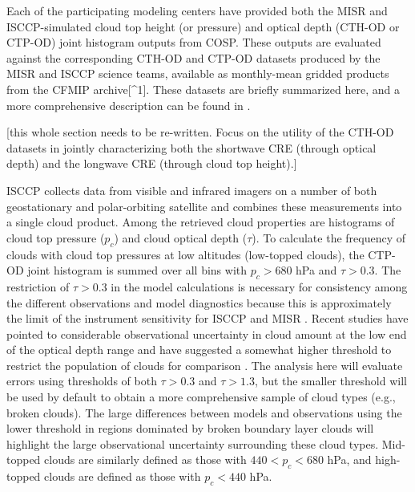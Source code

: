 Each of the participating modeling centers have provided both the MISR
and ISCCP-simulated cloud top height (or pressure) and optical depth
(CTH-OD or CTP-OD) joint histogram outputs from COSP. These outputs are
evaluated against the corresponding CTH-OD and CTP-OD datasets produced
by the MISR and ISCCP science teams, available as monthly-mean gridded
products from the CFMIP archive{[}\^{}1{]}. These datasets are briefly
summarized here, and a more comprehensive description can be found in
\citet{marchand_et_al_2010}.

{[}this whole section needs to be re-written. Focus on the utility of
the CTH-OD datasets in jointly characterizing both the shortwave CRE
(through optical depth) and the longwave CRE (through cloud top
height).{]}

ISCCP collects data from visible and infrared imagers on a number of
both geostationary and polar-orbiting satellite and combines these
measurements into a single cloud product. Among the retrieved cloud
properties are histograms of cloud top pressure (\(p_c\)) and cloud
optical depth (\(\tau\)). To calculate the frequency of clouds with
cloud top pressures at low altitudes (low-topped clouds), the CTP-OD
joint histogram is summed over all bins with \(p_c > 680\) hPa and
\(\tau > 0.3\). The restriction of \(\tau > 0.3\) in the model
calculations is necessary for consistency among the different
observations and model diagnostics because this is approximately the
limit of the instrument sensitivity for ISCCP and MISR
\citep{marchand_et_al_2010}. Recent studies have pointed to considerable
observational uncertainty in cloud amount at the low end of the optical
depth range and have suggested a somewhat higher threshold to restrict
the population of clouds for comparison
\citep[e.g.,][]{pincus_et_al_2012, zhao_and_digirolamo_2006}. The
analysis here will evaluate errors using thresholds of both
\(\tau > 0.3\) and \(\tau > 1.3\), but the smaller threshold will be
used by default to obtain a more comprehensive sample of cloud types
(e.g., broken clouds). The large differences between models and
observations using the lower threshold in regions dominated by broken
boundary layer clouds will highlight the large observational uncertainty
surrounding these cloud types. Mid-topped clouds are similarly defined
as those with \(440 < p_c < 680\) hPa, and high-topped clouds are
defined as those with \(p_c < 440\) hPa.

